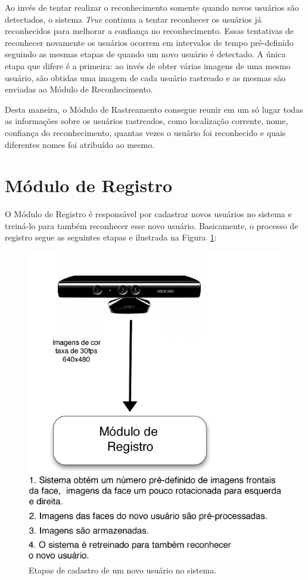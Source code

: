 	Ao invés de tentar realizar o reconhecimento somente quando novos usuários são detectados, o sistema \textit{True} continua a tentar reconhecer os usuários já reconhecidos para melhorar a confiança no reconhecimento. Essas tentativas de reconhecer novamente os usuários ocorrem em intervalos de tempo pré-definido seguindo as mesmas etapas de quando um novo usuário é detectado. A única etapa que difere é a primeira: ao invés de obter várias imagens de uma mesmo usuário, são obtidas uma imagem de cada usuário rastreado e as mesmas são enviadas ao Módulo de Reconhecimento.

	Desta maneira, o Módulo de Rastreamento consegue reunir em um só lugar todas as informações sobre os usuários rastreados, como localização corrente, nome, confiança do reconhecimento, quantas vezes o usuário foi reconhecido e quais diferentes nomes foi atribuído ao mesmo.


\section{Módulo de Registro}

	O Módulo de Registro é responsável por cadastrar novos usuários no sistema e treiná-lo para também reconhecer esse novo usuário. Basicamente, o processo de registro segue as seguintes etapas e ilustrada na Figura~\ref{fig:registro}:

		\begin{figure}[hbt]
			\begin{center}
				\includegraphics[scale=2.5]{figuras/4.ProblemaEProposta/registro.png}
			\end{center}
			\caption{Etapas de cadastro de um novo usuário no sistema.}
			\label{fig:registro}
		\end{figure}		

